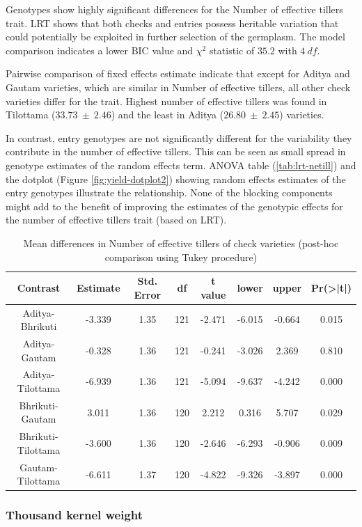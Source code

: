 \documentclass[12pt,oneside]{dukestatscithesis} %
\begin{document}
Genotypes show highly significant differences for the Number of effective tillers trait. LRT shows that both checks and entries possess heritable variation that could potentially be exploited in further selection of the germplasm. The model comparison indicates a lower BIC value and \(\chi^2\) statistic of \(35.2\) with \(4\ df\).

Pairwise comparison of fixed effects estimate indicate that except for Aditya and Gautam varieties, which are similar in Number of effective tillers, all other check varieties differ for the trait. Highest number of effective tillers was found in Tilottama (\(33.73\ \pm\ 2.46\)) and the least in Aditya (\(26.80\ \pm\ 2.45\)) varieties.

In contrast, entry genotypes are not significantly different for the variability they contribute in the number of effective tillers. This can be seen as small spread in genotype estimates of the random effects term. ANOVA table (\ref{tab:lrt-netill}) and the dotplot (Figure \ref{fig:yield-dotplot2}) showing random effects estimates of the entry genotypes illustrate the relationship. None of the blocking components might add to the benefit of improving the estimates of the genotypic effects for the number of effective tillers trait (based on LRT).
\begin{table}[H]

\caption{\label{tab:yield-meanconf-tab2}Mean differences in Number of effective tillers of check varieties (post-hoc comparison using Tukey procedure)}
\centering
\begin{tabular}[t]{cccccccc}
\toprule
Contrast & Estimate & Std. Error & df & t value & lower & upper & Pr(>|t|)\\
\midrule
Aditya-Bhrikuti & -3.339 & 1.35 & 121 & -2.471 & -6.015 & -0.664 & 0.015\\
Aditya-Gautam & -0.328 & 1.36 & 121 & -0.241 & -3.026 & 2.369 & 0.810\\
Aditya-Tilottama & -6.939 & 1.36 & 121 & -5.094 & -9.637 & -4.242 & 0.000\\
Bhrikuti-Gautam & 3.011 & 1.36 & 120 & 2.212 & 0.316 & 5.707 & 0.029\\
Bhrikuti-Tilottama & -3.600 & 1.36 & 120 & -2.646 & -6.293 & -0.906 & 0.009\\
Gautam-Tilottama & -6.611 & 1.37 & 120 & -4.822 & -9.326 & -3.897 & 0.000\\
\bottomrule
\end{tabular}
\end{table}
\hypertarget{thousand-kernel-weight}{%
\subsubsection{Thousand kernel weight}\label{thousand-kernel-weight}}
\end{document}
